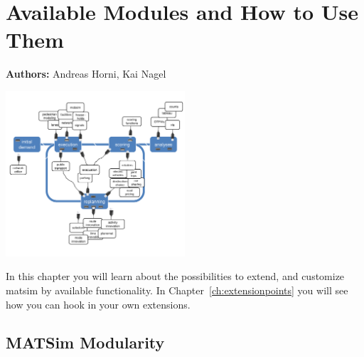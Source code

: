 \chapter{Available Modules and How to Use Them}
\label{ch:modules}

\hfill \textbf{Authors:} Andreas Horni, Kai Nagel

\begin{center} \includegraphics[width=0.5\textwidth, angle=0]{extending/figures/modules.pdf} \end{center}

In this chapter you will learn about the possibilities to extend, and customize \gls{matsim} by available functionality. In Chapter~\ref{ch:extensionpoints} you will see how you can hook in your own extensions.


\section{MATSim Modularity}
\label{sec:matsim-modularity}

